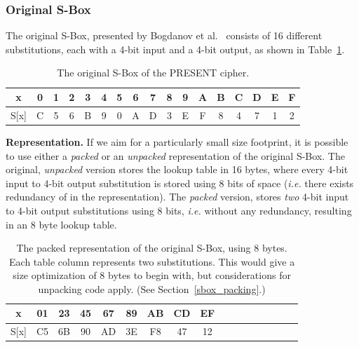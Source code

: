 \documentclass[11pt]{llncs2e} %
\begin{document}
\subsubsection{Original S-Box}\label{osbox}
The original S-Box, presented by Bogdanov et al.~\cite{bogdanov2007present} consists of 16 different substitutions, each with a 4-bit input and a 4-bit output, as shown in Table~\ref{original_sbox}.

\begin{table}
\footnotesize
\centering
\begin{tabular}{| c | c  | c | c | c  | c | c | c  | c | c | c  | c | c | c  | c | c | c |}
\hline
  x & 0 & 1 & 2 & 3 & 4 & 5 & 6 & 7 & 8 & 9 & A & B & C & D & E & F   \\
\hline
  S[x] & C & 5 & 6 & B & 9 & 0 & A & D & 3 & E & F & 8 & 4 & 7 & 1 & 2   \\
\hline
\end{tabular}
 \caption{\footnotesize The original S-Box of the PRESENT cipher.}
 \label{original_sbox}
\end{table}

\textbf{Representation.} If we aim for a particularly small size footprint, it is possible to use either a \emph{packed} or an \emph{unpacked} representation of the original S-Box.
The original, \emph{unpacked} version stores the lookup table in 16 bytes, where every 4-bit input to 4-bit output substitution is stored using 8 bits of space (\emph{i.e.} there exists redundancy of in the representation). 
The \emph{packed} version, stores \emph{two} 4-bit input to 4-bit output substitutions using 8 bits, \emph{i.e.} without any redundancy, resulting in an 8 byte lookup table. \\

\begin{table}[h]
\centering
\footnotesize
\begin{tabular}{| c | c  | c | c | c  | c | c | c  | c | c | c  | c | c | c  | c | c | c |}
\hline
  x & 01 & 23 & 45 & 67 & 89 & AB & CD & EF   \\
\hline
  S[x] & C5 & 6B & 90 & AD & 3E & F8 & 47 & 12   \\
\hline
\end{tabular}
 \caption{\footnotesize The packed representation of the original S-Box, using 8 bytes. Each table column represents two substitutions. This would give a size optimization of 8 bytes to begin with, but considerations for unpacking code apply. (See Section~\ref{sbox_packing}.)}
 \label{packed_sbox}
\end{table}
\end{document}

